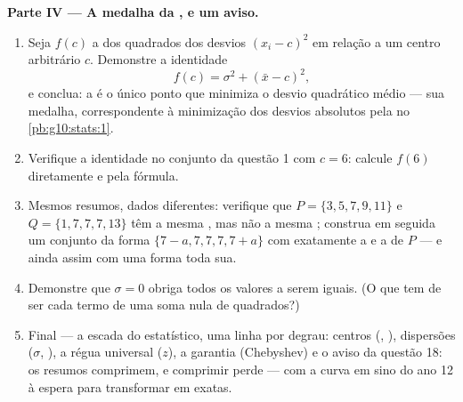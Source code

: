 \begin{problem}
\medskip
\noindent\textbf{Parte IV --- A medalha da , e um aviso.}
\begin{enumerate}[resume]
  \item Seja $f(c)$ a  dos quadrados dos desvios
        $(x_i - c)^2$ em relação a um centro arbitrário $c$.
        Demonstre a identidade
        \[
        f(c) = \sigma^2 + (\bar x - c)^2 ,
        \]
        e conclua: a  é o único ponto que minimiza o
        desvio quadrático médio --- sua medalha, correspondente à
        minimização dos desvios absolutos pela  no
        \cref{pb:g10:stats:1}.
  \item Verifique a identidade no conjunto da questão 1 com
        $c = 6$: calcule $f(6)$ diretamente e pela fórmula.
  \item Mesmos resumos, dados diferentes: verifique que
        $P = \{3, 5, 7, 9, 11\}$ e $Q = \{1, 7, 7, 7, 13\}$ têm a
        mesma , mas não a mesma ; construa em
        seguida um conjunto da forma $\{7 - a, 7, 7, 7, 7 + a\}$
        com exatamente a  e a  de $P$ --- e ainda
        assim com uma forma toda sua.
  \item Demonstre que $\sigma = 0$ obriga todos os valores a
        serem iguais. (O que tem de ser cada termo de uma soma
        nula de quadrados?)
  \item Final --- a escada do estatístico, uma linha por degrau:
        centros (, ), dispersões ($\sigma$,
        ), a régua universal ($z$), a
        garantia (Chebyshev) e o aviso da questão 18: os resumos
        comprimem, e comprimir perde --- com a curva em sino do
        ano 12 à espera para transformar  em
         exatas.
\end{enumerate}
\end{problem}
